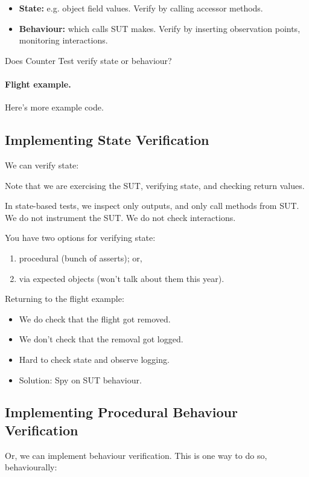 \documentclass[11pt]{article}
\begin{document}
\begin{itemize}[noitemsep]
\item {\bf State:} e.g. object field values.
    Verify by calling accessor methods.
  \item {\bf Behaviour:} which calls SUT makes.
    Verify by inserting observation points, monitoring interactions.
\end{itemize}

Does Counter Test verify state or behaviour?

\paragraph{Flight example.} Here's more example code.

\newpage
\subsection*{Implementing State Verification}
We can verify state:

Note that we are exercising the SUT, verifying state,
and checking return values.

In state-based tests, we inspect only outputs, and only call methods from SUT. We do not instrument the SUT. We do not check interactions.

You have two options for verifying state:
\begin{enumerate}[noitemsep]
\item procedural (bunch of asserts); or,
\item via expected objects (won't talk about them this year).
\end{enumerate}

Returning to the flight example:
\begin{itemize}[noitemsep]
\item We do check that the flight got removed.
\item We don't check that the removal got logged.
\item Hard to check state and observe logging.
\item Solution: Spy on SUT behaviour.
\end{itemize}

\newpage
\subsection*{Implementing Procedural Behaviour Verification}
Or, we can implement behaviour verification. This is one
way to do so, behaviourally:
\end{document}
